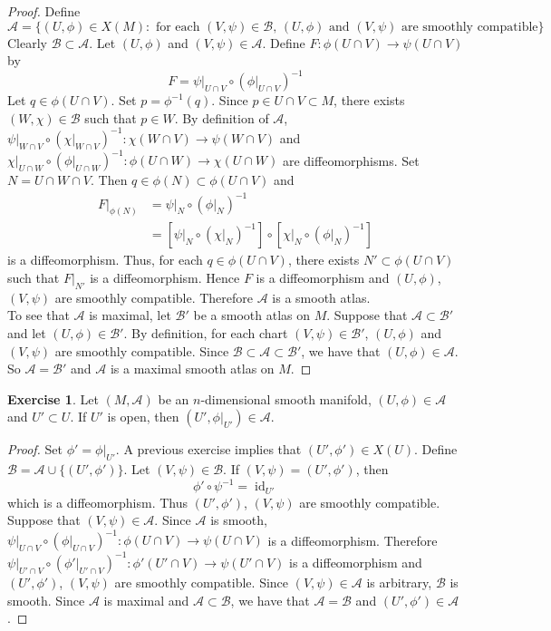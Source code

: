 \documentclass{book}
\theoremstyle{definition}
\newtheorem{ex}[definition]{Exercise}
\newcommand{\MA}{\mathcal{A}}
\newcommand{\MB}{\mathcal{B}}
\DeclareMathOperator{\id}{id}
\DeclareMathOperator*{\0}{\mbf{0}}
\DeclareMathOperator*{\1}{\mbf{1}}
\begin{document}
	\begin{proof}
		Define 
		$$\MA = \{(U, \phi) \in X(M): \text{ for each $(V, \psi) \in \MB$,  $(U, \phi)$ and $(V, \psi) $ are smoothly compatible}\}$$ 
		Clearly $\MB \subset \MA$. Let $(U, \phi)$ and $(V, \psi) \in \MA$. Define $F: \phi(U \cap V) \rightarrow \psi (U \cap V)$ by 
		$$F = \psi|_{U \cap V} \circ (\phi|_{U \cap V})^{-1}$$
		Let $q \in \phi(U \cap V)$. Set $p = \phi^{-1}(q)$. Since $p \in U \cap V \subset M$, there exists $(W, \chi) \in \MB$ such that $p \in W$. By definition of $\MA$, $\psi|_{W \cap V} \circ (\chi|_{W \cap V})^{-1} : \chi(W \cap V) \rightarrow \psi(W \cap V)$ and $ \chi|_{U \cap W} \circ (\phi|_{U \cap W})^{-1} : \phi(U \cap W) \rightarrow \chi(U \cap W)$ are diffeomorphisms. Set $N = U \cap W \cap V$. Then $q \in \phi(N) \subset \phi(U \cap V)$ and 
		\begin{align*}
			F|_{\phi(N)}
			& = \psi|_{N} \circ (\phi|_{N})^{-1} \\
			& = [\psi|_{N} \circ (\chi|_{N})^{-1}] \circ [\chi|_{N} \circ (\phi|_{N})^{-1}]
		\end{align*}
		is a diffeomorphism. 
		Thus, for each $q \in \phi(U \cap V)$, there exists $N' \subset \phi(U \cap V)$ such that $F|_{N'}$ is a diffeomorphism. Hence $F$ is a diffeomorphism and $(U, \phi)$, $(V, \psi)$ are smoothly compatible. Therefore $\MA$ is a smooth atlas.\\
		To see that $\MA$ is maximal, let $\MB'$ be a smooth atlas on $M$. Suppose that $\MA \subset \MB'$ and let $(U, \phi) \in \MB'$. By definition, for each chart $(V, \psi) \in \MB'$, $(U, \phi)$ and $(V, \psi)$ are smoothly compatible. Since $\MB \subset \MA \subset \MB'$, we have that $(U, \phi) \in \MA$. So $\MA = \MB'$ and $\MA$ is a maximal smooth atlas on $M$.
	\end{proof}

	\begin{ex}
		Let $(M, \MA)$ be an $n$-dimensional smooth manifold, $(U, \phi) \in \MA$ and $U' \subset U$. If $U'$ is open, then $(U', \phi|_{U'}) \in \MA$. 
	\end{ex}

	\begin{proof}
	Set $\phi' = \phi|_{U'}$. A previous exercise implies that $(U', \phi') \in X(U)$. Define $\MB = \MA \cup \{(U', \phi')\}$. Let $(V, \psi) \in \MB$. If $(V, \psi) = (U', \phi')$, then 
	$$\phi' \circ \psi^{-1} = \id_{U'}$$
	which is a diffeomorphism. Thus $(U', \phi')$, $(V, \psi)$ are smoothly compatible. Suppose that $(V, \psi) \in \MA$. Since $\MA$ is smooth, $\psi|_{U \cap V} \circ (\phi|_{U \cap V})^{-1}: \phi(U \cap V) \rightarrow \psi(U \cap V)$ is a diffeomorphism. Therefore $\psi|_{U' \cap V} \circ (\phi'|_{U' \cap V})^{-1}: \phi'(U' \cap V) \rightarrow \psi(U' \cap V)$ is a diffeomorphism and $(U', \phi')$, $(V, \psi)$ are smoothly compatible. Since $(V, \psi) \in \MA$ is arbitrary, $\MB$ is smooth. Since $\MA$ is maximal and $\MA \subset \MB$, we have that $\MA = \MB$ and $(U', \phi') \in \MA$.
	\end{proof}
\end{document}
